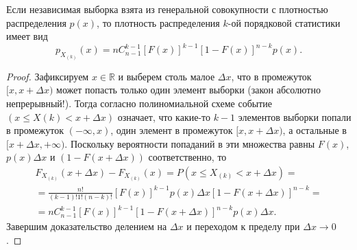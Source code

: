 \begin{theorem}
	Если независимая выборка взята из генеральной совокупности с
плотностью распределения $p(x)$, то плотность распределения $k$-ой порядковой
статистики имеет вид 
\[
	p_{X_{(k)}}(x) = n C^{k-1}_{n-1} \left[ F(x) \right]^{k-1} [1 - F(x)]^{n-k}
	p(x).
\]
\end{theorem}
\begin{proof}
Зафиксируем $ x \in \mathbb R $ и выберем столь малое $ \Delta x $, что в
промежуток $ [x, x+ \Delta x) $ может попасть только один элемент выборки (закон
абсолютно непрерывный!). Тогда согласно полиномиальной схеме событие 
$(x \leqslant X(k) < x + \Delta x)$ означает, что какие-то $ k - 1 $ элементов
выборки попали в промежуток $ (-\infty, x) $, 
один элемент в промежуток $[x, x + \Delta x)$, а остальные в $[x + \Delta x,
+\infty)$. Поскольку вероятности 
попаданий в эти множества равны $ F(x) $, $ p(x)\Delta x $ и $(1 − F(x + \Delta
x))$ соответственно, то  
\begin{multline*}
	F_{X_{(k)}}(x+\Delta x) - F_{X_{(k)}} (x) = P(x \leqslant X_{(k)} < x + \Delta
	x) = \\ =
	\frac{n!}{(k-1)!1!(n-k)!} [F(x)]^{k-1} p(x) \Delta x [1 - F(x + \Delta
	x)]^{n-k} = \\ =
	n C^{k-1}_{n-1} [F(x)]^{k-1} [1 - F(x + \Delta x)]^{n-k} p(x)\Delta x.
\end{multline*}
Завершим доказательство делением на $ \Delta x $ и переходом к пределу при $
\Delta x \to 0 $.
\end{proof}



